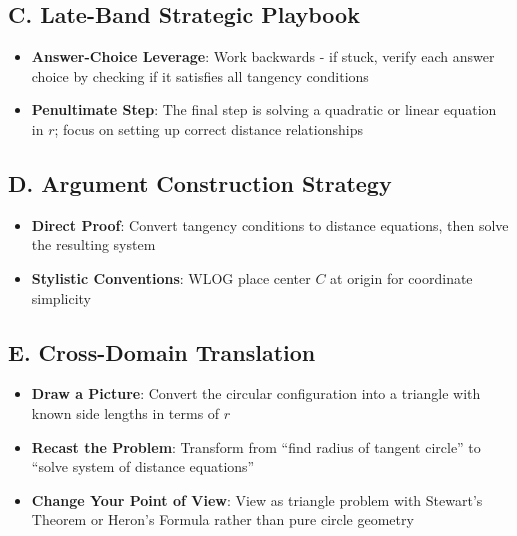 \documentclass[]{article}
\begin{document}
\begin{strategicbox}
\subsection*{C. Late-Band Strategic Playbook}
\begin{itemize}[leftmargin=*]
    \item \textbf{Answer-Choice Leverage}: Work backwards - if stuck, verify each answer choice by checking if it satisfies all tangency conditions
    \item \textbf{Penultimate Step}: The final step is solving a quadratic or linear equation in $r$; focus on setting up correct distance relationships
\end{itemize}

\subsection*{D. Argument Construction Strategy}
\begin{itemize}[leftmargin=*]
    \item \textbf{Direct Proof}: Convert tangency conditions to distance equations, then solve the resulting system
    \item \textbf{Stylistic Conventions}: WLOG place center $C$ at origin for coordinate simplicity
\end{itemize}

\subsection*{E. Cross-Domain Translation}
\begin{itemize}[leftmargin=*]
    \item \textbf{Draw a Picture}: Convert the circular configuration into a triangle with known side lengths in terms of $r$
    \item \textbf{Recast the Problem}: Transform from ``find radius of tangent circle'' to ``solve system of distance equations''
    \item \textbf{Change Your Point of View}: View as triangle problem with Stewart's Theorem or Heron's Formula rather than pure circle geometry
\end{itemize}
\end{strategicbox}
\end{document}
